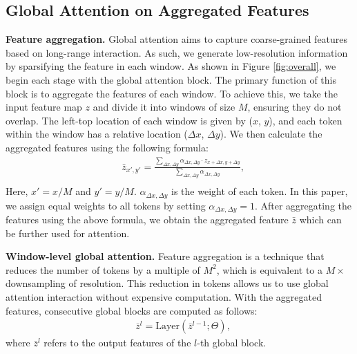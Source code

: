 \subsection{Global Attention on Aggregated Features}
\label{sec:global}

\noindent\textbf{Feature aggregation.} 
\label{para:feature_agg}
Global attention aims to capture coarse-grained features based on long-range interaction. As such, we generate low-resolution information by sparsifying the feature in each window.
As shown in Figure \ref{fig:overall}, we begin each stage with the global attention block.
%
The primary function of this block is to aggregate the features of each window. 
%
To achieve this, we take the input feature map $z$ and divide it into windows of size $M$, ensuring they do not overlap. The left-top location of each window is given by ($x$, $y$), and each token within the window has a relative location ($\Delta x$, $\Delta y$).
%
We then calculate the aggregated features using the following formula:
\begin{equation}
\begin{split}
     & \bar{z}_{x',y'}  = 
     \frac{{\textstyle \sum_{\Delta x,\Delta y}^{}}\alpha _{\Delta x,\Delta y} \cdot  z_{x+\Delta x,y+\Delta y}}
     { 
     {\textstyle \sum_{\Delta x,\Delta y}^{}}\alpha _{\Delta x,\Delta y}}, \\
\end{split}
\label{eq:aggregate}
\end{equation}
Here, $x' =x / M$ and $y' =y / M$. $\alpha _{\Delta x,\Delta y}$ is the weight of each token. In this paper, we assign equal weights to all tokens by setting $\alpha _{\Delta x,\Delta y}=1$.
%
After aggregating the features using the above formula, we obtain the aggregated feature $\bar{z}$ which can be further used for attention.


\vspace{2mm}\noindent\textbf{Window-level global attention.}
Feature aggregation is a technique that reduces the number of tokens by a multiple of $M^2$, which is equivalent to a $M\times$ downsampling of resolution. This reduction in tokens allows us to use global attention interaction without expensive computation. 
With the aggregated features, consecutive global blocks are computed as follows: 
\begin{equation}
\begin{split}
  & \bar{z}^{l} = \text{Layer}(\bar{z}^{l-1}; \Theta),
 \end{split}
 \label{eq:global_att}
\end{equation}
where $\bar{z}^{l}$ refers to the output features of the $l$-th global block.

